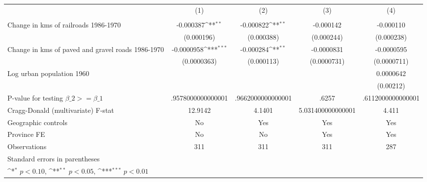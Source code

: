 {
\def\sym#1{\ifmmode^{#1}\else\(^{#1}\)\fi}
\begin{tabular}{l*{4}{c}}
\hline\hline
                &\multicolumn{1}{c}{(1)}&\multicolumn{1}{c}{(2)}&\multicolumn{1}{c}{(3)}&\multicolumn{1}{c}{(4)}\\
                &\multicolumn{1}{c}{}&\multicolumn{1}{c}{}&\multicolumn{1}{c}{}&\multicolumn{1}{c}{}\\
\hline
Change in kms of railroads 1986-1970&-0.000387\sym{**} &-0.000822\sym{**} &-0.000142         &-0.000110         \\
                &(0.000196)         &(0.000388)         &(0.000244)         &(0.000238)         \\
[1em]
Change in kms of paved and gravel roads 1986-1970&-0.0000958\sym{***}&-0.000284\sym{**} &-0.0000831         &-0.0000595         \\
                &(0.0000363)         &(0.000113)         &(0.0000731)         &(0.0000711)         \\
[1em]
Log urban population 1960&                  &                  &                  &0.0000642         \\
                &                  &                  &                  &(0.00212)         \\
\hline
P-value for testing $\beta\_{2} >= \beta\_{1}$&.9578000000000001         &.9662000000000001         &    .6257         &.6112000000000001         \\
Cragg-Donald (multivariate) F-stat&  12.9142         &   4.1401         &5.031400000000001         &    4.411         \\
Geographic controls&       No         &      Yes         &      Yes         &      Yes         \\
Province FE     &       No         &       No         &      Yes         &      Yes         \\
Observations    &      311         &      311         &      311         &      287         \\
\hline\hline
\multicolumn{5}{l}{\footnotesize Standard errors in parentheses}\\
\multicolumn{5}{l}{\footnotesize \sym{*} \(p<0.10\), \sym{**} \(p<0.05\), \sym{***} \(p<0.01\)}\\
\end{tabular}
}

